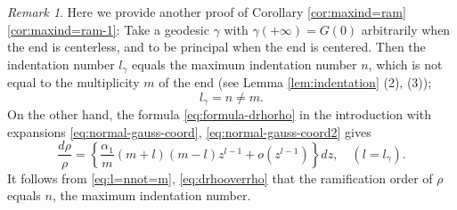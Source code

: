 \documentclass[a4paper]{amsart}
\theoremstyle{plain}
\theoremstyle{remark}
\newtheorem{remark}[theorem]{Remark}
\numberwithin{equation}{section}
\begin{document}
\begin{remark}\label{rmk:referee}
Here we provide another proof of 
Corollary \ref{cor:maxind=ram} \ref{cor:maxind=ram-1}:  
 Take a geodesic $\gamma$ with $\gamma(+\infty)=G(0)$
 arbitrarily when the end is centerless, and
 to be principal when the end is centered. 
Then the indentation number $l_{\gamma}$ equals 
the maximum indentation number $n$, which is not equal to 
the multiplicity $m$ of the end 
(see Lemma \ref{lem:indentation} (2), (3)); 
\begin{equation}\label{eq:l=nnot=m}
 l_{\gamma} = n \ne m. 
\end{equation}  
On the other hand, the formula \eqref{eq:formula-drhorho} 
in the introduction 
with expansions \eqref{eq:normal-gauss-coord},  
\eqref{eq:normal-gauss-coord2} gives 
\begin{equation}\label{eq:drhooverrho}
 \frac{d \rho}{\rho} = \left\{
\frac{\alpha_1}{m}(m+l)(m-l)z^{l-1}+o(z^{l-1})
\right\}dz, \quad (l = l_{\gamma}). 
\end{equation}
It follows from 
\eqref{eq:l=nnot=m}, \eqref{eq:drhooverrho} that 
the ramification order of $\rho$ equals 
$n$, the maximum indentation number. 
\end{remark}
\end{document}
